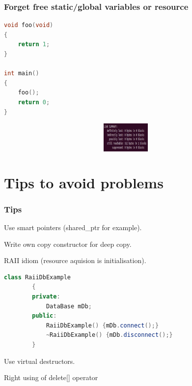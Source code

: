 \documentclass{bredelebeamer}
\begin{document}
\begin{frame}[fragile]
	\frametitle{Forget free static/global variables or resource}
	\begin{center}
		\begin{lstlisting}[language=C++]
void foo(void)
{
	return 1;
}

int main()
{
	foo();
	return 0;
}

		\end{lstlisting}
	\end{center}

	\begin{center}
		\begin{figure}
			\includegraphics[height=1.5cm,width=11cm]{forget_free_static2.png}
		\end{figure}
	\end{center}
\end{frame}

\section{Tips to avoid problems}
\begin{frame}[fragile]
	\frametitle{Tips}
	\begin{center}
		\begin{exampleblock}{}
			Use smart pointers (shared\_ptr for example).
		\end{exampleblock}
		\begin{exampleblock}{}
			Write own copy constructor for deep copy.
		\end{exampleblock}
		\begin{exampleblock}{}
			RAII idiom (resource aquision is initialisation).
		\begin{lstlisting}[language=C++]
		class RaiiDbExample
		{
		private:
			DataBase mDb;
		public:
			RaiiDbExample() {mDb.connect();}
			~RaiiDbExample() {mDb.disconnect();}
		}

		\end{lstlisting}

		\end{exampleblock}
		\begin{exampleblock}{}
			Use virtual destructors.
		\end{exampleblock}
		\begin{exampleblock}{}
		Right using of delete[] operator
		\end{exampleblock}
	\end{center}
\end{frame}
\end{document}
